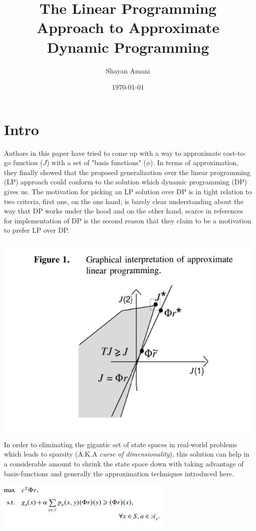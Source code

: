 \documentclass[a4paper,12pt]{article}
\title{The Linear Programming Approach to Approximate Dynamic Programming}
\author{Shayan Amani}
\date{\today}
\begin{document}
\maketitle

\section{Intro}
Authors in this paper have tried to come up with a way to approximate cost-to-go function ($J$) with a set of "basis functions" ($\phi$). In terms of approximation, they finally showed that the proposed generalization over the linear programming (LP) approach could conform to the solution which dynamic programming (DP) gives us. The motivation for picking an LP solution over DP is in tight relation to two criteria, first one, on the one hand, is barely clear understanding about the way that DP works under the hood and on the other hand, scarce in references for implementation of DP is the second reason that they claim to be a motivation to prefer LP over DP.

\includegraphics[width=1\columnwidth]{alp-fig.png}


In order to eliminating the gigantic set of state spaces in real-world problems which leads to sparsity (A.K.A \textit{curse of dimensionality}), this solution can help in a considerable amount to shrink the state space down with taking advantage of basis-functions and generally the approximation techniques introduced here.

\includegraphics[width=1\columnwidth]{lp.png}
\end{document}
